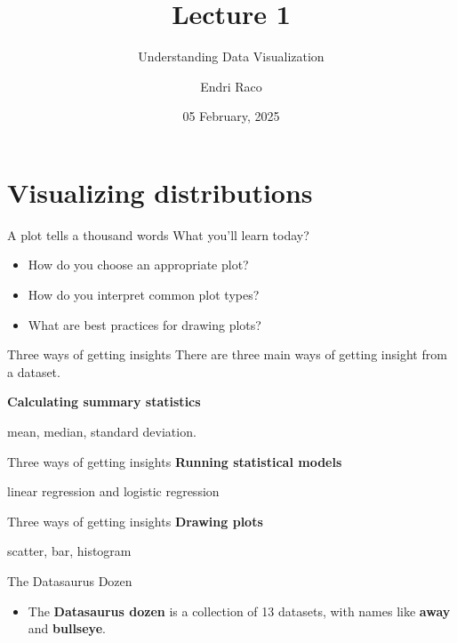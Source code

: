 \documentclass[
  ignorenonframetext,
]{beamer}
\title{Lecture 1}
\subtitle{Understanding Data Visualization}
\author{Endri Raco}
\date{05 February, 2025}
\providecommand{\tightlist}{%
  \setlength{\itemsep}{0pt}\setlength{\parskip}{0pt}}
\begin{document}
\frame{\titlepage}

\begin{frame}[allowframebreaks]
  \tableofcontents[hideallsubsections]
\end{frame}
\section{Visualizing distributions}\label{visualizing-distributions}

\begin{frame}{A plot tells a thousand words}
\label{a-plot-tells-a-thousand-words}
What you'll learn today?

\begin{itemize}
\item
  How do you choose an appropriate plot?
\item
  How do you interpret common plot types?
\item
  What are best practices for drawing plots?
\end{itemize}
\end{frame}

\begin{frame}{Three ways of getting insights}
\label{three-ways-of-getting-insights}
There are three main ways of getting insight from a dataset.

\textbf{Calculating summary statistics}

mean, median, standard deviation.
\end{frame}

\begin{frame}{Three ways of getting insights}
\label{three-ways-of-getting-insights-1}
\textbf{Running statistical models}

linear regression and logistic regression
\end{frame}

\begin{frame}{Three ways of getting insights}
\label{three-ways-of-getting-insights-2}
\textbf{Drawing plots}

scatter, bar, histogram
\end{frame}

\begin{frame}{The Datasaurus Dozen}
\label{the-datasaurus-dozen}
\begin{itemize}
\tightlist
\item
  The \textbf{Datasaurus dozen} is a collection of 13 datasets, with
  names like \textbf{away} and \textbf{bullseye}.
\end{itemize}
\end{frame}
\end{document}
